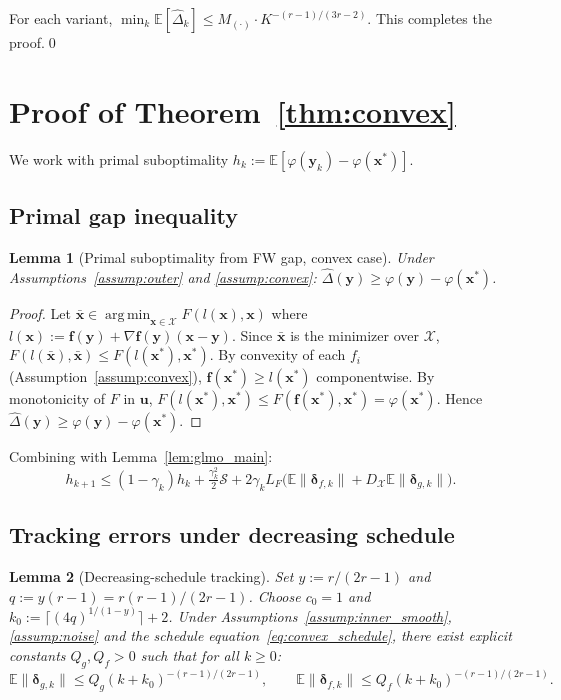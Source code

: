 \documentclass{article}
\def\eqref#1{equation~\ref{#1}}
\newcommand{\cX}{\mathcal{X}}
\def\vf{{\bm{f}}}
\def\vu{{\bm{u}}}
\def\vx{{\bm{x}}}
\def\vy{{\bm{y}}}
\newcommand{\E}{\mathbb{E}}
\DeclareMathOperator*{\argmin}{arg\,min}
\newtheorem{lemma}{Lemma}
\begin{document}
For each variant, $\min_k \E[\hat\Delta_k] \le M_{(\cdot)} \cdot K^{-(r-1)/(3r-2)}$. This completes the proof.\hfill\qed

\section{Proof of Theorem~\ref{thm:convex}} \label{sec:proof_convex}

We work with primal suboptimality $h_k := \E[\varphi(\vy_k) - \varphi(\vx^*)]$.

\subsection{Primal gap inequality}

\begin{lemma}[Primal suboptimality from FW gap, convex case] \label{lem:convex_primal}
Under Assumptions~\ref{assump:outer} and \ref{assump:convex}: $\hat\Delta(\vy) \ge \varphi(\vy) - \varphi(\vx^*)$.
\end{lemma}

\begin{proof}
Let $\bar\vx \in \argmin_{\vx \in \cX} F(l(\vx), \vx)$ where $l(\vx) := \vf(\vy) + \nabla\vf(\vy)(\vx - \vy)$. Since $\bar\vx$ is the minimizer over $\cX$,
$F(l(\bar\vx), \bar\vx) \le F(l(\vx^*), \vx^*)$. By convexity of each $f_i$ (Assumption~\ref{assump:convex}), $\vf(\vx^*) \ge l(\vx^*)$ componentwise. By monotonicity of $F$ in $\vu$, $F(l(\vx^*), \vx^*) \le F(\vf(\vx^*), \vx^*) = \varphi(\vx^*)$. Hence $\hat\Delta(\vy) \ge \varphi(\vy) - \varphi(\vx^*)$.
\end{proof}

Combining with Lemma~\ref{lem:glmo_main}:
\begin{equation} \label{eq:convex_recur}
h_{k+1} \le (1 - \gamma_k) h_k + \tfrac{\gamma_k^2}{2}\mathcal{S} + 2\gamma_k L_F\big(\E\|\bm\delta_{f,k}\| + D_\cX \E\|\bm\delta_{g,k}\|\big).
\end{equation}

\subsection{Tracking errors under decreasing schedule}

\begin{lemma}[Decreasing-schedule tracking] \label{lem:convex_tracking}
Set $y := r/(2r-1)$ and $q := y(r-1) = r(r-1)/(2r-1)$. Choose $c_0 = 1$ and $k_0 := \lceil (4q)^{1/(1-y)}\rceil + 2$. Under Assumptions~\ref{assump:inner_smooth}, \ref{assump:noise} and the schedule \eqref{eq:convex_schedule}, there exist explicit constants $Q_g, Q_f > 0$ such that for all $k \ge 0$:
\[
\E\|\bm\delta_{g,k}\| \le Q_g (k+k_0)^{-(r-1)/(2r-1)}, \qquad \E\|\bm\delta_{f,k}\| \le Q_f (k+k_0)^{-(r-1)/(2r-1)}.
\]
\end{lemma}
\end{document}
